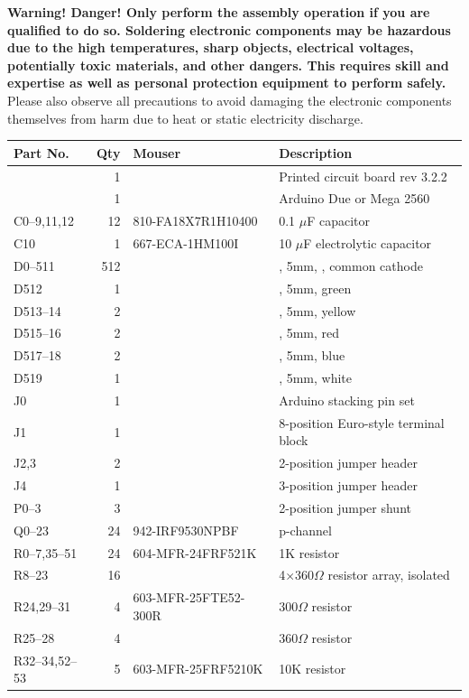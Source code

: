 {\bfseries Warning! Danger! Only perform the assembly operation if you are qualified to do so. Soldering electronic components
may be hazardous due to the high temperatures, sharp objects, electrical voltages, potentially toxic materials,
and other dangers. This requires skill and expertise as well as personal protection equipment to perform safely.}
Please also observe all precautions to avoid damaging the electronic components themselves from harm due to
heat or static electricity discharge.
\newcommand\mouser[1]{{\sffamily\footnotesize#1}}
\begin{table}
	\begin{tabular}{lrll}\toprule
		{\bfseries Part No.}&{\bfseries Qty}&{\bfseries Mouser}&{\bfseries Description}\\\midrule
		&1&&Printed circuit board rev 3.2.2\\
		&1&&Arduino Due or Mega 2560\\
		C0--9,11,12&12&\mouser{810-FA18X7R1H10400}&0.1 $\mu$F capacitor\\
		C10&1&\mouser{667-ECA-1HM100I}&10 $\mu$F electrolytic capacitor\\
		D0--511&512&&\led, 5mm, \acronym{RGB}, common cathode\\
		D512&1&&\led, 5mm, green\\
		D513--14&2&&\led, 5mm, yellow\\
		D515--16&2&&\led, 5mm, red\\
		D517--18&2&&\led, 5mm, blue\\
		D519&1&&\led, 5mm, white\\
		J0&1&&Arduino stacking pin set\\
		J1&1&&8-position Euro-style terminal block\\
		J2,3&2&&2-position jumper header\\
		J4&1&&3-position jumper header\\
		P0--3&3&&2-position jumper shunt\\
		Q0--23&24&\mouser{942-IRF9530NPBF}&\mc{IRF9530} p-channel \acronym{MOSFET}\\
		R0--7,35--51&24&\mouser{604-MFR-24FRF521K}&1K resistor\\
		R8--23&16&&4$\times$360$\Omega$ resistor array, isolated\\
		R24,29--31&4&\mouser{603-MFR-25FTE52-300R}&300$\Omega$ resistor\\
		R25--28&4&&360$\Omega$ resistor\\
		R32--34,52--53&5&\mouser{603-MFR-25FRF5210K}&10K resistor\\

\end{tabular}
\end{table}
